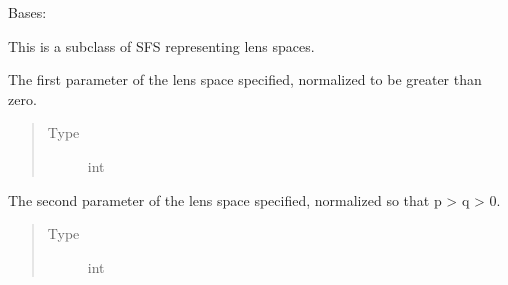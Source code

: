 \documentclass[letterpaper,10pt,english]{sphinxmanual}
\begin{document}
\begin{fulllineitems}
\label{\detokenize{soapy:soapy.Lens}}
\sphinxAtStartPar
Bases: {\hyperref[\detokenize{soapy:soapy.SFS}]{}}

\sphinxAtStartPar
This is a subclass of SFS representing lens spaces.

\begin{fulllineitems}
\label{\detokenize{soapy:soapy.Lens.p}}
\sphinxAtStartPar
The first parameter of the lens space specified, normalized to be greater than zero.
\begin{quote}\begin{description}
\item[{Type}] \leavevmode
\sphinxAtStartPar
int

\end{description}\end{quote}

\end{fulllineitems}


\begin{fulllineitems}
\label{\detokenize{soapy:soapy.Lens.q}}
\sphinxAtStartPar
The second parameter of the lens space specified, normalized so that p \textgreater{} q \textgreater{} 0.
\begin{quote}\begin{description}
\item[{Type}] \leavevmode
\sphinxAtStartPar
int

\end{description}\end{quote}

\end{fulllineitems}



\end{fulllineitems}
\end{document}
